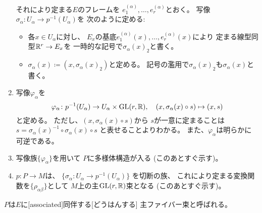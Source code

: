 \documentclass[report]{jlreq}
\begin{document}
\begin{definition}[フレーム束]
\begin{enumerate}
            それにより定まる$E$のフレームを
            $e_1^{(\alpha)}, \dots, e_r^{(\alpha)}$とおく。
            写像$\sigma_\alpha \colon U_\alpha \to p^{-1}(U_\alpha)$を
            次のように定める:
            \begin{itemize}
                \item 各$x \in U_\alpha$に対し、
                    $E_x$の基底$e_1^{(\alpha)}(x), \dots, e_r^{(\alpha)}(x)$により
                    定まる線型同型$\mathbb{R}^r \to E_x$を
                    一時的な記号で$\sigma_\alpha(x)_2$と書く。
                \item $\sigma_\alpha(x) \coloneqq (x, \sigma_\alpha(x)_2)$と定める。
                    記号の濫用で$\sigma_\alpha(x)_2$も$\sigma_\alpha(x)$と書く。
            \end{itemize}
        \item 写像$\varphi_\alpha$を
            \begin{equation}
                \varphi_\alpha
                    \colon p^{-1}(U_\alpha) \to U_\alpha \times \operatorname{\mathrm{GL}}(r, \mathbb{R}),
                    \quad
                    (x, \sigma_\alpha(x) \circ s) \mapsto (x, s)
            \end{equation}
            と定める。
            ただし、$(x, \sigma_\alpha(x) \circ s)$から
            $s$が一意に定まることは
            $s = \sigma_\alpha(x)^{-1} \circ \sigma_\alpha(x) \circ s$
            と表せることよりわかる。
            また、$\varphi_\alpha$は明らかに可逆である。
        \item 写像族$\{ \varphi_\alpha \}$を用いて
            $P$に多様体構造が入る (このあとすぐ示す)。
        \item $p \colon P \to M$は、
            $\{ \sigma_\alpha \colon U_\alpha \to p^{-1}(U_\alpha) \}$
            を切断の族、
            これにより定まる変換関数を$\{ \rho_{\alpha\beta} \}$として
            $M$上の主$\operatorname{\mathrm{GL}}(r, \mathbb{R})$束となる (このあとすぐ示す)。
    \end{enumerate}
    $P$は$E$に[associated]{同伴する}[どうはんする]
    主ファイバー束と呼ばれる。
\end{definition}
\end{document}
